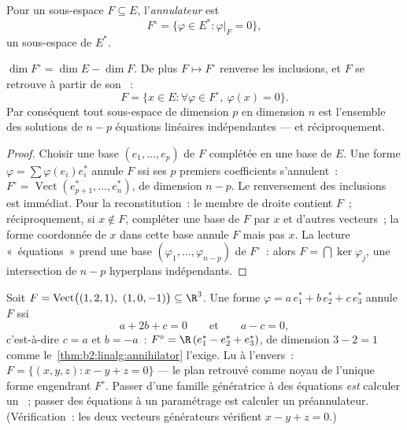 \begin{definition}[Annulateur]\label{def:b2:linalg:annihilator}
Pour un sous-espace $F \subseteq E$, l'\emph{annulateur} est
\[
F^{\circ} = \{\varphi \in E^* : \varphi|_F = 0\},
\]
un sous-espace de $E^*$.
\end{definition}

\begin{theorem}\label{thm:b2:linalg:annihilator}
$\dim F^{\circ} = \dim E - \dim F$. De plus $F \mapsto F^\circ$
renverse les inclusions, et $F$ se retrouve à partir de son ~:
\[
F = \{x \in E : \forall\varphi \in F^\circ,\ \varphi(x) = 0\}.
\]
Par conséquent tout sous-espace de dimension $p$ en dimension $n$ est
l'ensemble des solutions de $n - p$ équations linéaires indépendantes
--- et réciproquement.
\end{theorem}

\begin{proof}
Choisir une base $(e_1, \dots, e_p)$ de $F$ complétée en une base de
$E$. Une forme $\varphi = \sum \varphi(e_i) e_i^*$ annule $F$ ssi
ses $p$ premiers coefficients s'annulent~: $F^\circ =
\operatorname{Vect}(e_{p+1}^*, \dots, e_n^*)$, de dimension $n - p$.
Le renversement des inclusions est immédiat. Pour la reconstitution~: le
membre de droite contient $F$~; réciproquement, si $x \notin F$,
compléter une base de $F$ par $x$ et d'autres vecteurs~; la forme
coordonnée de $x$ dans cette base annule $F$ mais pas $x$. La lecture
«~équations~» prend une base $(\varphi_1, \dots, \varphi_{n-p})$ de
$F^\circ$~: alors $F = \bigcap \ker\varphi_j$, une intersection de $n
- p$ hyperplans indépendants.
\end{proof}

\begin{example}\label{ex:b2:linalg:annihilatorwork}
Soit $F = \operatorname{Vect}\bigl((1, 2, 1),\ (1, 0, -1)\bigr)
\subseteq \R^3$. Une forme $\varphi = a\,e_1^* + b\,e_2^* + c\,e_3^*$
annule $F$ ssi
\[
a + 2b + c = 0
\qquad\text{et}\qquad
a - c = 0 ,
\]
c'est-à-dire $c = a$ et $b = -a$~: $F^\circ = \R\,(e_1^* - e_2^* +
e_3^*)$, de dimension $3 - 2 = 1$ comme
le~\cref{thm:b2:linalg:annihilator} l'exige. Lu à l'envers~:
$F = \{(x, y, z) : x - y + z = 0\}$ --- le plan retrouvé comme
noyau de l'unique forme engendrant $F^\circ$. Passer d'une famille
génératrice à des équations \emph{est} calculer un ~;
passer des équations à un paramétrage est calculer un
préannulateur. (Vérification~: les deux vecteurs générateurs vérifient
$x - y + z = 0$.)
\end{example}

